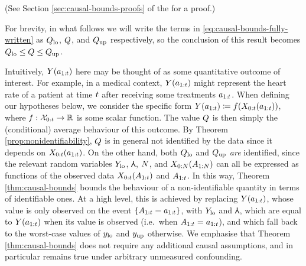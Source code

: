 \begin{theorem}
    
\end{theorem}
(See Section \ref{sec:causal-bounds-proofs} of the \AppendixName for a proof.)

For brevity, in what follows we will write the terms in \eqref{eq:causal-bounds-fully-written} as $Q_{\mathrm{lo}}$, $Q$, and $Q_{\mathrm{up}}$ respectively, so the conclusion of this result becomes $Q_{\mathrm{lo}} \leq Q \leq Q_{\mathrm{up}}$.

Intuitively, $Y(a_{1:t})$ here may be thought of as some quantitative outcome of interest.
For example, in a medical context, $Y(a_{1:t})$ might represent the heart rate of a patient at time $t$ after receiving some treatments $a_{1:t}$.
When defining our hypotheses below, we consider the specific form $Y(a_{1:t}) \coloneqq f(X_{0:t}(a_{1:t}))$, where $f : \mathcal{X}_{0:t} \to \mathbb{R}$ is some scalar function.
The value $Q$ is then simply the (conditional) average behaviour of this outcome.
By Theorem \ref{prop:nonidentifiability}, $Q$ is in general not identified by the data since it depends on $X_{0:t}(a_{1:t})$.
On the other hand, both $Q_{\mathrm{lo}}$ and $Q_{\mathrm{up}}$ \emph{are} identified, since the relevant random variables $Y_{\mathrm{lo}}$, $\Yup$, $N$, and $X_{0:N}(A_{1:N})$ can all be expressed as functions of the observed data $X_{0:t}(A_{1:t})$ and $A_{1:t}$.
In this way, Theorem \ref{thm:causal-bounds} bounds the behaviour of a non-identifiable quantity in terms of identifiable ones.
At a high level, this is achieved by replacing $Y(a_{1:t})$, whose value is only observed on the event $\{A_{1:t} = a_{1:t}\}$, with $Y_{\mathrm{lo}}$ and $\Yup$, which are equal to $Y(a_{1:t})$ when its value is observed (i.e.\ when $A_{1:t} = a_{1:t}$), and which fall back to the worst-case values of $y_{\mathrm{lo}}$ and $y_{\mathrm{up}}$ otherwise.
We emphasise that Theorem \ref{thm:causal-bounds} does not require any additional causal assumptions, and in particular remains true under arbitrary unmeasured confounding.

